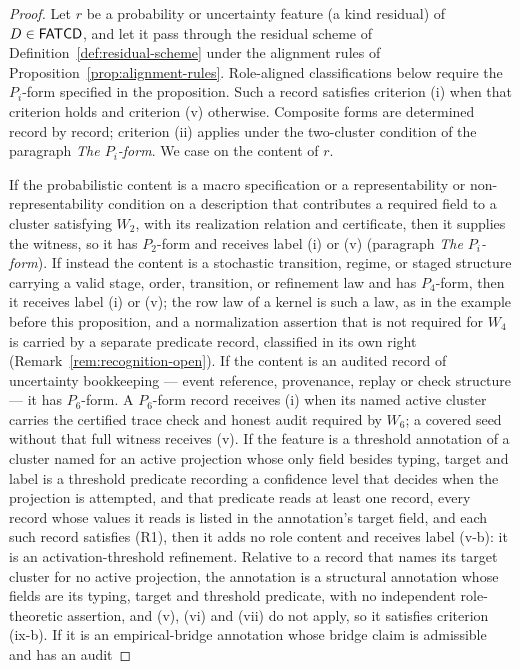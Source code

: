 \begin{proof}
Let \(r\) be a probability or uncertainty feature (a kind residual) of
\(D \in \mathsf{FATCD}{}\), and let it pass through the residual scheme of
Definition~\ref{def:residual-scheme} under the alignment rules of
Proposition~\ref{prop:alignment-rules}. Role-aligned classifications below require the \(P_i\)-form specified in the
proposition. Such a record satisfies criterion (i) when that criterion holds and
criterion (v) otherwise. Composite forms are determined record by record;
criterion (ii) applies under the two-cluster condition of the paragraph
\emph{The \(P_i\)-form}. We case on the content of \(r\).

If the probabilistic content is a macro specification or a
representability or non-representability condition on a description that
contributes a required field to a cluster satisfying \(W_2\), with its
realization relation and certificate, then it supplies the \Ptwo{}
witness, so it has \(P_2\)-form and receives label (i) or (v) (paragraph
\emph{The \(P_i\)-form}). If instead the content is a stochastic transition,
regime, or staged structure carrying a valid stage, order, transition,
or refinement law and has \(P_4\)-form, then it receives label (i) or (v); the
row law of a kernel is such a law, as in the example before this proposition,
and a normalization assertion that is not required for \(W_4\) is carried by a
separate predicate record, classified in its own right
(Remark~\ref{rem:recognition-open}). If the content is an audited record of uncertainty
bookkeeping --- event reference, provenance, replay or check structure
--- it has \(P_6\)-form. A \(P_6\)-form record receives (i) when its named
active cluster carries the certified trace check and honest audit required by
\(W_6\); a covered seed without that full witness receives (v). If the
feature is a threshold annotation of a cluster named for an active projection
whose only field besides typing, target and label is a threshold predicate recording a confidence level
that decides when the projection is attempted, and that predicate reads at least one record, every record whose values it reads is listed in the annotation's target field, and each such record satisfies (R1), then it adds no role content and receives
label (v-b): it is an activation-threshold
refinement. Relative to a record that names its target cluster for no active projection,
the annotation is a structural annotation whose fields are its typing, target
and threshold predicate, with no independent role-theoretic assertion, and
(v), (vi) and (vii) do not apply, so it satisfies criterion (ix-b). If it is an empirical-bridge annotation whose bridge claim is admissible and has an audit

\end{proof}
